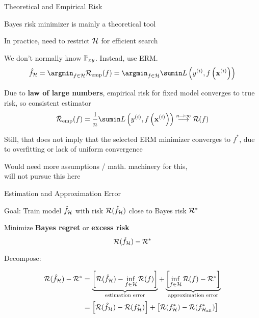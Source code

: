 \documentclass[11pt,compress,t,notes=noshow, xcolor=table]{beamer}
\begin{document}
\begin{framei}[sep=M]{Theoretical and Empirical Risk}  
 
\item Bayes risk minimizer is mainly a theoretical tool
\item In practice, need to restrict $\mathcal{H}$ for efficient search %
\item We don't normally know $\mathbb{P}_{xy}$. Instead, use ERM. 
$$
{\hat f}_{\Hspace} = \argmin_{f \in \Hspace} \riskef = \argmin_{f \in \Hspace} \sumin \Lxyi
$$
\item Due to \textbf{law of large numbers}, empirical risk for fixed model converges to true risk, so consistent estimator
$$
\riskeb(f) = \frac{1}{n} \sumin \Lxyi \overset{n \to \infty}{\longrightarrow} \riskf 
$$
\item Still, that does not imply that the selected ERM minimizer converges to $f^{\ast}$, due to overfitting or lack of uniform convergence 
\item Would need more assumptions / math. machinery for this, \\
will not pursue this here 

\end{framei}



\begin{framei}[sep=L]{Estimation and Approximation Error} 

\item Goal: Train model $\hat f_{\mathcal{H}}$ with risk $\mathcal{R}(\hat f_{\mathcal{H}})$ close to Bayes risk $\mathcal{R}^\ast$ \\
\item Minimize \textbf{Bayes regret} or \textbf{excess risk}
$$
\mathcal{R}(\hat f_{\mathcal{H}}) - \mathcal{R}^\ast
$$ 

\item Decompose: 

\begin{align*}
\mathcal{R}(\hat f_{\mathcal{H}}) - \mathcal{R}^\ast &= \underbrace{\left[\mathcal{R}(\hat f_{\mathcal{H}}) - \inf_{f \in \mathcal{H}} \mathcal{R}(f)\right]}_{\text{estimation error}} + \underbrace{\left[\inf_{f \in \mathcal{H}} \mathcal{R}(f) - \mathcal{R}^\ast\right]}_{\text{approximation error}} \\
&= \left[\mathcal{R}(\hat{f}_{\mathcal{H}}) - \mathcal{R}(f^{\ast}_{\mathcal{H}})\right] + \left[\mathcal{R}(f^{\ast}_{\mathcal{H}}) - \mathcal{R}(f^{\ast}_{\mathcal{H}_{\text{all}}}) \right] 
\end{align*}

\end{framei}
\end{document}
